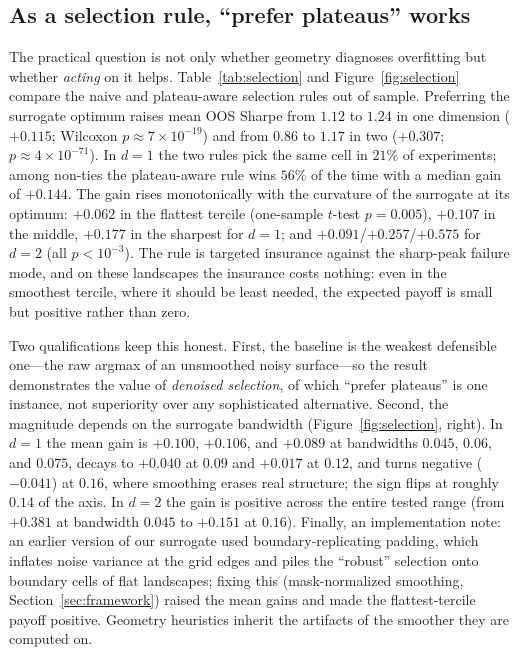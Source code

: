 \documentclass[11pt]{article}
\begin{document}
\subsection{As a selection rule, ``prefer plateaus'' works}
\label{sec:selection}

The practical question is not only whether geometry diagnoses overfitting but
whether \emph{acting} on it helps. Table~\ref{tab:selection} and
Figure~\ref{fig:selection} compare the naive and plateau-aware selection rules
out of sample. Preferring the surrogate optimum raises mean OOS Sharpe from
$1.12$ to $1.24$ in one dimension ($+0.115$; Wilcoxon
$p \approx 7\times10^{-19}$) and from $0.86$ to $1.17$ in two ($+0.307$;
$p \approx 4\times10^{-71}$). In $d{=}1$ the two rules pick the same cell in
$21\%$ of experiments; among non-ties the plateau-aware rule wins $56\%$ of the
time with a median gain of $+0.144$. The gain rises monotonically with the
curvature of the surrogate at its optimum: $+0.062$ in the flattest tercile
(one-sample $t$-test $p = 0.005$), $+0.107$ in the middle, $+0.177$ in the
sharpest for $d{=}1$; and $+0.091$/$+0.257$/$+0.575$ for $d{=}2$ (all
$p < 10^{-3}$). The rule is targeted insurance against the sharp-peak failure
mode, and on these landscapes the insurance costs nothing: even in the
smoothest tercile, where it should be least needed, the expected payoff is
small but positive rather than zero.

Two qualifications keep this honest. First, the baseline is the weakest
defensible one---the raw argmax of an unsmoothed noisy surface---so the result
demonstrates the value of \emph{denoised selection}, of which ``prefer
plateaus'' is one instance, not superiority over any sophisticated alternative.
Second, the magnitude depends on the surrogate bandwidth
(Figure~\ref{fig:selection}, right). In $d{=}1$ the mean gain is $+0.100$,
$+0.106$, and $+0.089$ at bandwidths $0.045$, $0.06$, and $0.075$, decays to
$+0.040$ at $0.09$ and $+0.017$ at $0.12$, and turns negative ($-0.041$) at
$0.16$, where smoothing erases real structure; the sign flips at roughly $0.14$
of the axis. In $d{=}2$ the gain is positive across the entire tested range
(from $+0.381$ at bandwidth $0.045$ to $+0.151$ at $0.16$). Finally, an
implementation note: an earlier version of our surrogate used
boundary-replicating padding, which inflates noise variance at the grid edges
and piles the ``robust'' selection onto boundary cells of flat landscapes;
fixing this (mask-normalized smoothing, Section~\ref{sec:framework}) raised the
mean gains and made the flattest-tercile payoff positive. Geometry heuristics
inherit the artifacts of the smoother they are computed on.
\end{document}
